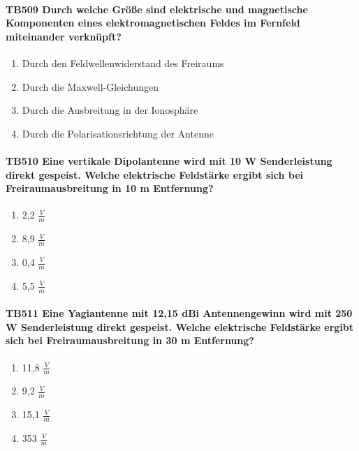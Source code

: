 \documentclass[8pt]{article}
\begin{document}
\begin{enumerate}
\paragraph*{TB509 Durch welche Größe sind elektrische und magnetische Komponenten eines elektromagnetischen Feldes im Fernfeld miteinander verknüpft?}
\begin{enumerate}[nolistsep,label=\Alph*]
\item Durch den Feldwellenwiderstand des Freiraums
\item Durch die Maxwell-Gleichungen
\item Durch die Ausbreitung in der Ionosphäre
\item Durch die Polarisationsrichtung der Antenne
\end{enumerate}



\paragraph*{TB510 Eine vertikale Dipolantenne wird mit 10 W Senderleistung direkt gespeist. Welche elektrische Feldstärke ergibt sich bei Freiraumausbreitung in 10 m Entfernung?}
\begin{enumerate}[nolistsep,label=\Alph*]
\item 2,2 $\frac{V}{m}$
\item 8,9 $\frac{V}{m}$
\item 0,4 $\frac{V}{m}$
\item 5,5 $\frac{V}{m}$
\end{enumerate}



\paragraph*{TB511 Eine Yagiantenne mit 12,15 dBi Antennengewinn wird mit 250 W Senderleistung direkt gespeist. Welche elektrische Feldstärke ergibt sich bei Freiraumausbreitung in 30 m Entfernung?}
\begin{enumerate}[nolistsep,label=\Alph*]
\item 11,8 $\frac{V}{m}$
\item 9,2 $\frac{V}{m}$
\item 15,1 $\frac{V}{m}$
\item 353 $\frac{V}{m}$
\end{enumerate}




\end{enumerate}
\end{document}
